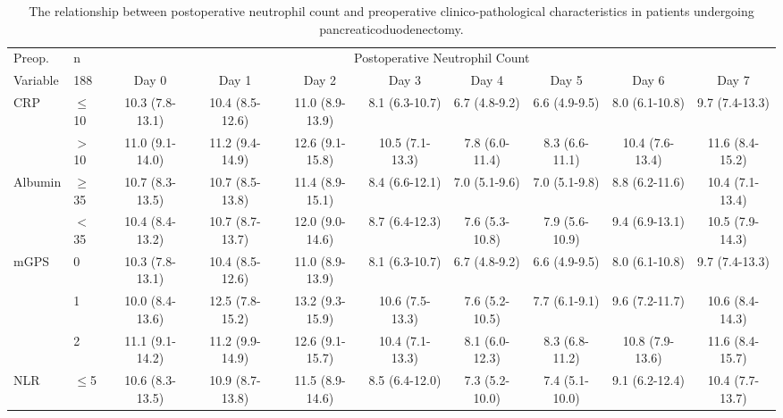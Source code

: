 \begin{sidewaystable}[p]
	\caption{The relationship  between postoperative neutrophil count and preoperative clinico-pathological characteristics in patients undergoing pancreaticoduodenectomy. }
	\label{table:sirs_neut}
	\footnotesize
	\centering
	\renewcommand{\arraystretch}{1.2} %
	\setlength{\tabcolsep}{5pt} %
	
	\begin{tabular}{|l l | cc cc cc cc |}
		\hline
		Preop.              & n         &                                             \multicolumn{8}{c|}{Postoperative Neutrophil Count}                                              \\
		Variable            & 188       & Day 0           &      Day 1      & Day 2            &      Day 3      & Day 4          &     Day 5      & Day 6           &      Day 7      \\ \hline
		CRP                 & $\leq$10  & 10.3 (7.8-13.1) & 10.4 (8.5-12.6) & 11.0 (8.9-13.9)  & 8.1 (6.3-10.7)  & 6.7 (4.8-9.2)  & 6.6 (4.9-9.5)  & 8.0 (6.1-10.8)  & 9.7 (7.4-13.3)  \\
		                    & $>$10     & 11.0 (9.1-14.0) & 11.2 (9.4-14.9) & 12.6 (9.1-15.8)  & 10.5 (7.1-13.3) & 7.8 (6.0-11.4) & 8.3 (6.6-11.1) & 10.4 (7.6-13.4) & 11.6 (8.4-15.2) \\
		Albumin             & $\geq$35  & 10.7 (8.3-13.5) & 10.7 (8.5-13.8) & 11.4 (8.9-15.1)  & 8.4 (6.6-12.1)  & 7.0 (5.1-9.6)  & 7.0 (5.1-9.8)  & 8.8 (6.2-11.6)  & 10.4 (7.1-13.4) \\
		                    & $<$35     & 10.4 (8.4-13.2) & 10.7 (8.7-13.7) & 12.0 (9.0-14.6)  & 8.7 (6.4-12.3)  & 7.6 (5.3-10.8) & 7.9 (5.6-10.9) & 9.4 (6.9-13.1)  & 10.5 (7.9-14.3) \\
		mGPS                & 0         & 10.3 (7.8-13.1) & 10.4 (8.5-12.6) & 11.0 (8.9-13.9)  & 8.1 (6.3-10.7)  & 6.7 (4.8-9.2)  & 6.6 (4.9-9.5)  & 8.0 (6.1-10.8)  & 9.7 (7.4-13.3)  \\
		                    & 1         & 10.0 (8.4-13.6) & 12.5 (7.8-15.2) & 13.2 (9.3-15.9)  & 10.6 (7.5-13.3) & 7.6 (5.2-10.5) & 7.7 (6.1-9.1)  & 9.6 (7.2-11.7)  & 10.6 (8.4-14.3) \\
		                    & 2         & 11.1 (9.1-14.2) & 11.2 (9.9-14.9) & 12.6 (9.1-15.7)  & 10.4 (7.1-13.3) & 8.1 (6.0-12.3) & 8.3 (6.8-11.2) & 10.8 (7.9-13.6) & 11.6 (8.4-15.7) \\
		NLR                 & $\leq$5   & 10.6 (8.3-13.5) & 10.9 (8.7-13.8) & 11.5 (8.9-14.6)  & 8.5 (6.4-12.0)  & 7.3 (5.2-10.0) & 7.4 (5.1-10.0) & 9.1 (6.2-12.4)  & 10.4 (7.7-13.7) \\

\end{tabular}
\end{sidewaystable}
